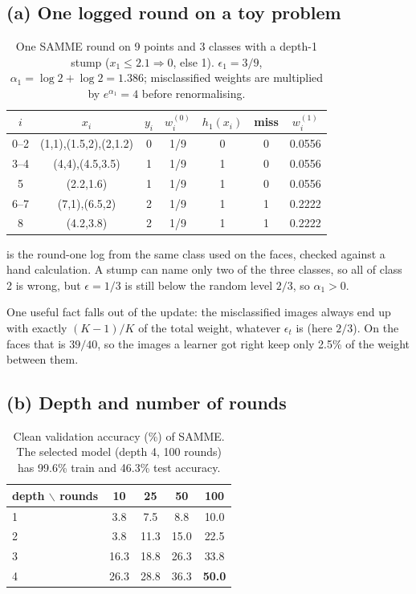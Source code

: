 \documentclass[10pt,twocolumn,letterpaper]{article}
\newcommand{\pct}[1]{#1\%}
\begin{document}
\subsection{(a) One logged round on a toy problem}
\begin{table}[t]
\centering\small
\begin{tabular}{ccccccc}
\toprule
$i$ & $x_i$ & $y_i$ & $w_i^{(0)}$ & $h_1(x_i)$ & miss & $w_i^{(1)}$\\
\midrule
0--2 & (1,1),(1.5,2),(2,1.2) & 0 & 1/9 & 0 & 0 & 0.0556\\
3--4 & (4,4),(4.5,3.5)       & 1 & 1/9 & 1 & 0 & 0.0556\\
5    & (2.2,1.6)             & 1 & 1/9 & 1 & 0 & 0.0556\\
6--7 & (7,1),(6.5,2)         & 2 & 1/9 & 1 & 1 & 0.2222\\
8    & (4.2,3.8)             & 2 & 1/9 & 1 & 1 & 0.2222\\
\bottomrule
\end{tabular}
\caption{One SAMME round on 9 points and 3 classes with a depth-1 stump
($x_1\le2.1\Rightarrow0$, else 1). $\epsilon_1=3/9$,
$\alpha_1=\log2+\log2=1.386$; misclassified weights are multiplied by
$e^{\alpha_1}=4$ before renormalising.}
\label{tab:toy}
\end{table}

 is the round-one log from the same class used on the faces,
checked against a hand calculation. A stump can name only two of the three
classes, so all of class 2 is wrong, but $\epsilon=1/3$ is still below the
random level $2/3$, so $\alpha_1>0$.

One useful fact falls out of the update: the misclassified images always end
up with exactly $(K-1)/K$ of the total weight, whatever $\epsilon_t$ is (here
$2/3$). On the faces that is $39/40$, so the images a learner got right keep
only 2.5\% of the weight between them.

\subsection{(b) Depth and number of rounds}
\begin{table}[t]
\centering\small
\begin{tabular}{lcccc}
\toprule
depth $\backslash$ rounds & 10 & 25 & 50 & 100\\
\midrule
1 & 3.8 & 7.5 & 8.8 & 10.0\\
2 & 3.8 & 11.3 & 15.0 & 22.5\\
3 & 16.3 & 18.8 & 26.3 & 33.8\\
4 & 26.3 & 28.8 & 36.3 & \textbf{50.0}\\
\bottomrule
\end{tabular}
\caption{Clean validation accuracy (\%) of SAMME. The selected model (depth 4,
100 rounds) has \pct{99.6} train and \pct{46.3} test accuracy.}
\label{tab:boostgrid}
\end{table}
\end{document}
